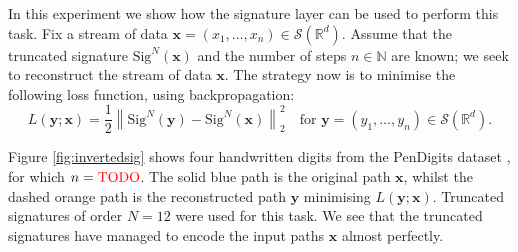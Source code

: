 \documentclass{article}
\theoremstyle{plain}
\theoremstyle{definition}
\newcommand{\nomath}[1]{\ifmmode
\mathrm{#1}%
\else
#1%
\fi}
\newcommand{\TODO}[1][]{\textcolor{red}{\ifx&#1&
\nomath{TODO}
\else
\nomath{TODO: #1}
\fi}}
\begin{document}
In this experiment we show how the signature layer can be used to perform this task. Fix a stream of data $\mathbf x = (x_1, \ldots, x_n) \in \mathcal S(\mathbb R^d)$. Assume that the truncated signature $\mathrm{Sig}^N(\mathbf x)$ and the number of steps $n\in \mathbb N$ are known; we seek to reconstruct the stream of data $\mathbf x$. The strategy now is to minimise the following loss function, using backpropagation:
\begin{equation*}
L(\mathbf y; \mathbf x) = \frac{1}{2} \left \lVert \mathrm{Sig}^N(\mathbf y) - \mathrm{Sig}^N(\mathbf x)\right \rVert_2^2\quad \mbox{for }\mathbf y=(y_1, \ldots, y_n)\in \mathcal S(\mathbb R^d).
\end{equation*}

Figure \ref{fig:invertedsig} shows four handwritten digits from the PenDigits dataset \cite{UCI}, for which $n=\TODO$. The solid blue path is the original path $\mathbf x$, whilst the dashed orange path is the reconstructed path $\mathbf y$ minimising $L(\mathbf y; \mathbf x)$. Truncated signatures of order $N=12$ were used for this task. We see that the truncated signatures have managed to encode the input paths $\mathbf x$ almost perfectly.
\end{document}
